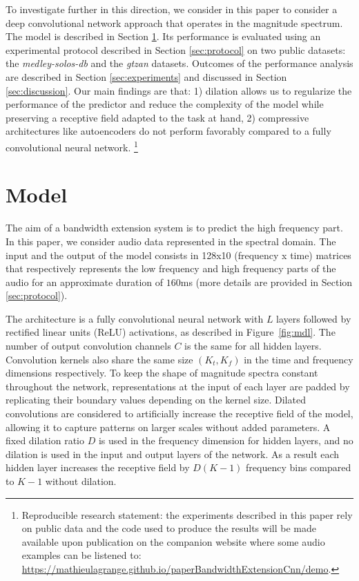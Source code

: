 \documentclass{article}
\begin{document}
To investigate further in this direction, we consider in this paper to consider a deep convolutional network approach that operates in the magnitude spectrum. The model is described in Section \ref{sec:model}. Its performance is evaluated using an experimental protocol described in Section \ref{sec:protocol} on two public datasets: the \textit{medley-solos-db} and the \textit{gtzan} datasets. Outcomes of the performance analysis are described in Section \ref{sec:experiments} and discussed in Section \ref{sec:discussion}. Our main findings are that: 1) dilation allows us to regularize the performance of the predictor and reduce the complexity of the model while preserving a receptive field adapted to the task at hand, 2) compressive architectures like autoencoders do not perform favorably compared to a fully convolutional neural network. \footnote{Reproducible research statement: the experiments described in this paper rely on public data and the code used to produce the results will be made available upon publication on the companion website where some audio examples can be listened to: \url{https://mathieulagrange.github.io/paperBandwidthExtensionCnn/demo}.}

\section{Model}
\label{sec:model}

The aim of a bandwidth extension system is to predict the high frequency part. In this paper, we consider audio data represented in the spectral domain. The input and the output of the model consists in 128x10 (frequency x time) matrices that respectively represents the low frequency and high frequency parts of the audio for an approximate duration of $160$ms (more details are provided in Section \ref{sec:protocol}).

The architecture is a fully convolutional neural network \cite{long2015fully} with $L$ layers followed by rectified linear units (ReLU) activations, as described in Figure~\ref{fig:mdl}. The number of output convolution channels $C$ is the same for all hidden layers. Convolution kernels also share the same size $(K_t, K_f)$ in the time and frequency dimensions respectively. To keep the shape of magnitude spectra constant throughout the network, representations at the input of each layer are padded by replicating their boundary values depending on the kernel size. Dilated convolutions \cite{yu2016multi, oord2016wavenet} are considered to artificially increase the receptive field of the model, allowing it to capture patterns on larger scales without added parameters. A fixed dilation ratio $D$ is used in the frequency dimension for hidden layers, and no dilation is used in the input and output layers of the network. As a result each hidden layer increases the receptive field by $D(K-1)$ frequency bins compared to $K-1$ without dilation.
\end{document}
